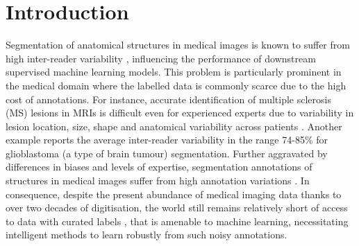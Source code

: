 \section{Introduction}
Segmentation of anatomical structures in medical images is known to suffer from high inter-reader variability \cite{lazarus2006bi,watadani2013interobserver,rosenkrantz2013comparison,menze2014multimodal,joskowicz2019inter}, influencing the performance of downstream supervised machine learning models. This problem is particularly prominent in the medical domain where the labelled data is commonly scarce due to the high cost of annotations. For instance, accurate identification of multiple sclerosis (MS) lesions in MRIs is difficult even for experienced experts due to variability in lesion location, size, shape and anatomical variability across patients \cite{zhang2019multiple}. Another example \cite{menze2014multimodal} reports the average inter-reader variability in the range 74-85\% for glioblastoma (a type of brain tumour) segmentation. Further aggravated by differences in biases and levels of expertise, segmentation annotations of structures in medical images suffer from high annotation variations \cite{kats2019soft}. In consequence, despite the present abundance of medical imaging data thanks to over two decades of digitisation, the world still remains relatively short of access to data with curated labels \cite{harvey2019standardised}, that is amenable to machine learning, necessitating intelligent methods to learn robustly from such noisy annotations.


